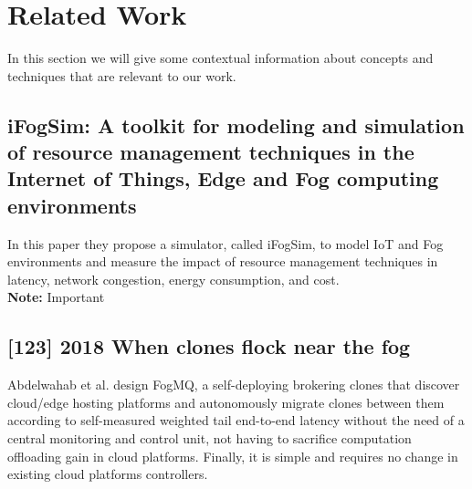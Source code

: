 \vfill
\pagebreak
\section{Related Work}
\label{sec:RelatedWork}

In this section we will give some contextual information about concepts and techniques that are relevant to our work.

\subsection{iFogSim: A toolkit for modeling and simulation of resource management techniques in the Internet of Things, Edge and Fog computing environments}
\label{subsec:paper01} \cite{gupta2017ifogsim}
In this paper they propose a simulator, called iFogSim, to model IoT and Fog environments and measure the impact of resource management techniques in latency, network congestion, energy consumption, and cost.\\
\textbf{Note:} Important

\subsection{[123] 2018 When clones flock near the fog}
\label{subsec:paper02}
Abdelwahab et al. \cite{abdelwahab2018clones} design FogMQ, a self-deploying brokering clones that discover cloud/edge hosting platforms and autonomously migrate clones between them according to self-measured weighted tail end-to-end latency without the need of a central monitoring and control unit, not having to sacrifice computation offloading gain in cloud platforms. Finally, it is simple and requires no change in existing cloud platforms controllers.

